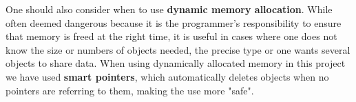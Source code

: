 \documentclass[twoside,english]{uiofysmaster}
\begin{document}
One should also consider when to use \textbf{dynamic memory allocation}. While often deemed dangerous because it is the programmer's responsibility to ensure that memory is freed at the right time, it is useful in cases where one does not know the size or numbers of objects needed, the precise type or one wants several objects to share data. When using dynamically allocated memory in this project we have used \textbf{smart pointers}, which automatically deletes objects when no pointers are referring to them, making the use more "safe".





\begin{comment}
Abstract base class. support the notion of a general concept of which only more concrete object variants are actually used.
ABCs are only used as a base class for subsequent derivations
– Therefore, it’s illegal to create objects of ABCs
– However it is legal to declare pointers or references to such objects

Pointers
Dynamic binding
Efficiency vs flexibility
Using virtual methods adds a small amount of time and space overhead to the class/object size and method invocation time.

Such methods are declared with the keyword \texttt{virtual} which signals dynamic binding. Dynamic binding refers to the fact that the method to be called is selected at runtime. 


Function overriding is an example of runtime polyimorphism becuase it is unkown until runtime which implementation will be executed.



OOP
- encapsulation - modularity
Polymorhpism
Abstract classes, virtual functions
Shared pointers, dynamic

Conditionals vs. polymorhisms. Polymorphism and encapsulation. Modularity. Object orientation. Diagrams, code snippets. 





Issue:
It is natural for the MC method to have the options Met brute force / hastings / gibbs. However - the type of wf partly dictates which can be used. Positive def wf -> gibbs. General - Met brute force/hastings. In the latter case MC method user may decide. But how to communicate this choice efficiently to the wf model? An if test at every function call - seems extremely unnecessary. Making subclasses of the wf or wf model - too restricting because natural to have both options for the same data model. If there were virtual functions based on if tests at a class level rather than polymorphisms..


\end{comment}
\end{document}
